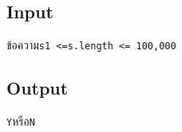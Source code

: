 \documentclass{article}
\begin{document}
\subsection*{Input}
ข้อความ\texttt{s}\texttt{1\ \textless{}=s.length\ \textless{}=\ 100,000}\textbf{}\\



\subsection*{Output}
\texttt{Y}หรือ\texttt{N}\\
\end{document}
